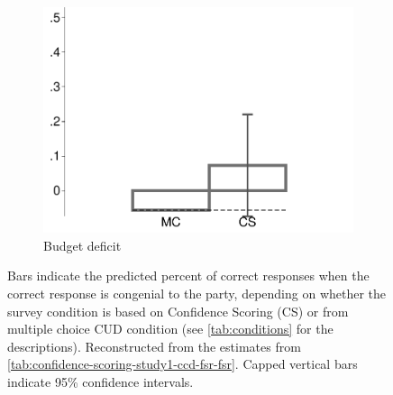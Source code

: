 \begin{figure}[t]
\begin{subfigure}{.325\textwidth}
		\includegraphics[width=\textwidth]{../figs/confidence_score_ccd_fsr_fsr_deficit_study1.pdf}
		\caption{Budget deficit}
	\end{subfigure}	
	\caption*{\footnotesize 
		Bars indicate the predicted percent of correct responses when the correct response is congenial to the party, depending on whether the survey condition is based on Confidence Scoring (CS) or from multiple choice CUD condition (see \cref{tab:conditions} for the descriptions).
		Reconstructed from the estimates from \cref{tab:confidence-scoring-study1-ccd-fsr-fsr}.
		Capped vertical bars indicate 95\% confidence intervals.
	}
	\label{fig:confidence-scoring-study1-ccd-fsr-fsr}
\end{figure}

